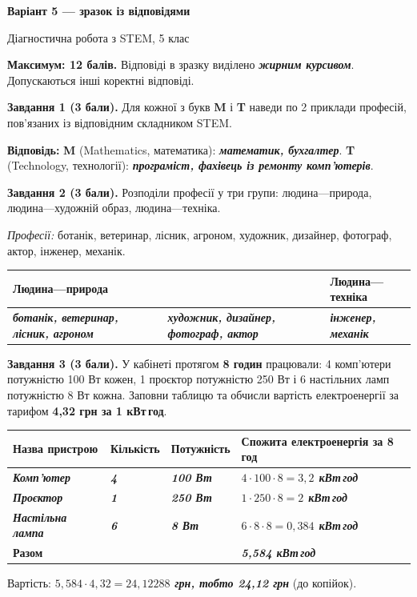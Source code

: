 \documentclass[11pt,a4paper]{article}
\newcommand{\answer}[1]{\textbf{\textit{#1}}}
\begin{document}
\begin{center}
\Large\textbf{Варіант 5 --- зразок із відповідями}\par
\normalsize Діагностична робота з STEM, 5 клас
\end{center}

\textbf{Максимум: 12 балів.} Відповіді в зразку виділено \answer{жирним курсивом}. Допускаються інші коректні відповіді.

\textbf{Завдання 1 (3 бали).} Для кожної з букв \textbf{M} і \textbf{T} наведи по 2 приклади професій, пов'язаних із відповідним складником STEM.\par
\textbf{Відповідь:} \textbf{M} (Mathematics, математика): \answer{математик, бухгалтер}. \textbf{T} (Technology, технології): \answer{програміст, фахівець із ремонту комп'ютерів}.

\textbf{Завдання 2 (3 бали).} Розподіли професії у три групи: людина---природа, людина---художній образ, людина---техніка.\par
\textit{Професії:} ботанік, ветеринар, лісник, агроном, художник, дизайнер, фотограф, актор, інженер, механік.\par
\begin{tabularx}{\linewidth}{|Y|Y|Y|}\hline
\textbf{Людина---природа} & \textbf{} & \textbf{Людина---техніка}\\\hline
\answer{ботанік, ветеринар, лісник, агроном} & \answer{художник, дизайнер, фотограф, актор} & \answer{інженер, механік}\\\hline
\end{tabularx}

\textbf{Завдання 3 (3 бали).} У кабінеті протягом \textbf{8 годин} працювали: 4 комп'ютери потужністю 100 Вт кожен, 1 проєктор потужністю 250 Вт і 6 настільних ламп потужністю 8 Вт кожна. Заповни таблицю та обчисли вартість електроенергії за тарифом \textbf{4,32 грн за 1 кВт\,год}.\par
\begin{tabularx}{\linewidth}{|Y|>{\centering\arraybackslash}p{22mm}|>{\centering\arraybackslash}p{25mm}|>{\centering\arraybackslash}p{38mm}|}\hline
\textbf{Назва пристрою} & \textbf{Кількість} & \textbf{Потужність} & \textbf{Спожита електроенергія за 8 год}\\\hline
\answer{Комп'ютер} & \answer{4} & \answer{100 Вт} & \answer{$4\cdot100\cdot8=3{,}2$ кВт\,год}\\\hline
\answer{Проєктор} & \answer{1} & \answer{250 Вт} & \answer{$1\cdot250\cdot8=2$ кВт\,год}\\\hline
\answer{Настільна лампа} & \answer{6} & \answer{8 Вт} & \answer{$6\cdot8\cdot8=0{,}384$ кВт\,год}\\\hline
\textbf{Разом} & & & \answer{5,584 кВт\,год}\\\hline
\end{tabularx}\par
Вартість: \answer{$5{,}584\cdot4{,}32=24{,}12288$ грн, тобто 24,12 грн} (до копійок).
\end{document}
